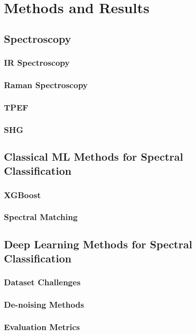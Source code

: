 \section{Methods and Results}
\subsection{Spectroscopy}
\subsubsection{IR Spectroscopy}
\subsubsection{Raman Spectroscopy}
\subsubsection{TPEF}
\subsubsection{SHG}

\subsection{Classical ML Methods for Spectral Classification}
\subsubsection{XGBoost}
\subsubsection{Spectral Matching}


\subsection{Deep Learning Methods for Spectral Classification}
\subsubsection{Dataset Challenges}
\subsubsection{De-noising Methods}
\subsubsection{Evaluation Metrics}
